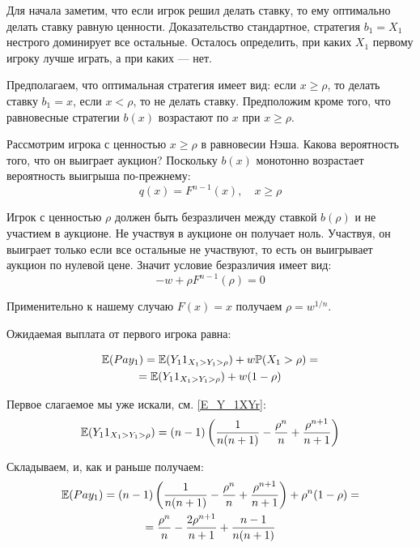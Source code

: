 \begin{enumerate}
Для начала заметим, что если игрок решил делать ставку, то ему оптимально делать ставку равную ценности. Доказательство стандартное, стратегия $ b_{1}=X_{1} $ нестрого доминирует все остальные. Осталось определить, при каких $ X_{1} $ первому игроку лучше играть, а при каких  — нет.

Предполагаем, что оптимальная стратегия имеет вид: если $ x\geq \rho $, то делать ставку $ b_{1}=x $, если $ x<\rho $, то не делать ставку. Предположим кроме того, что равновесные стратегии $ b(x) $ возрастают по $ x $ при $ x\geq \rho $.

Рассмотрим игрока с ценностью $ x\geq \rho $ в равновесии Нэша. Какова вероятность того, что он выиграет аукцион? Поскольку $ b(x) $ монотонно возрастает вероятность выигрыша по-прежнему:
\begin{equation}
q(x)=F^{n-1}(x),\quad x\geq \rho
\end{equation}

Игрок с ценностью $ \rho $ должен быть безразличен между ставкой $ b(\rho) $ и не участием в аукционе. Не участвуя в аукционе он получает ноль. Участвуя, он выиграет только если все остальные не участвуют, то есть он выигрывает аукцион по нулевой цене. Значит условие безразличия имеет вид:
\begin{equation}
-w+\rho F^{n-1}(\rho)=0
\end{equation}

Применительно к нашему случаю $ F(x)=x $ получаем $ \rho=w^{1/n} $.


Ожидаемая выплата от первого игрока равна:

\begin{multline}
\mathbb{E}(Pay_{1})=\mathbb{E}(Y_{1}1_{X_{1}>Y_{1}>\rho})+w\mathbb{P}(X_{1}>\rho)=\\
=\mathbb{E}(Y_{1}1_{X_{1}>Y_{1}>\rho})+w(1-\rho)
\end{multline}

Первое слагаемое мы уже искали, см. \ref{E_Y_1XYr}:
\begin{equation}
\mathbb{E}(Y_{1}1_{X_{1}>Y_{1}>\rho})=(n-1)\left(\frac{1}{n(n+1)}-\frac{\rho^{n}}{n}+\frac{\rho^{n+1}}{n+1}\right)
\end{equation}

Складываем, и, как и раньше получаем:
\begin{multline}
\mathbb{E}(Pay_{1})=(n-1)\left(\frac{1}{n(n+1)}-\frac{\rho^{n}}{n}+\frac{\rho^{n+1}}{n+1}\right)+\rho^{n}(1-\rho)=\\
=\frac{\rho^{n}}{n}-\frac{2\rho^{n+1}}{n+1}+\frac{n-1}{n(n+1)}
\end{multline}


\end{enumerate}
